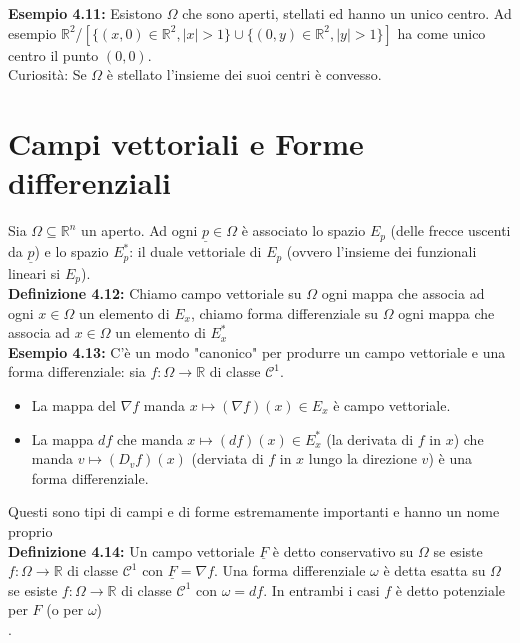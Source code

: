 \documentclass[a4paper,11pt,titlepage]{book}
\begin{document}
\textbf{Esempio 4.11: }Esistono $\Omega$ che sono aperti, stellati ed hanno un unico centro. Ad esempio $\mathbb{R}^2$/$\left[\{(x,0)\in\mathbb{R}^2, |x|>1\}\cup\{(0,y)\in\mathbb{R}^2, |y|>1\}\right]$ ha come unico centro il punto $(0,0)$.\\

Curiosità: Se $\Omega$ è stellato l'insieme dei suoi centri è convesso.

\section{Campi vettoriali e Forme differenziali}

Sia $\Omega\subseteq\mathbb{R}^n$ un aperto. Ad ogni $\underline{p}\in\Omega$ è associato lo spazio $E_p$ (delle frecce uscenti da $\underline p$) e lo spazio $E_p^*$: il duale vettoriale di $E_p$ (ovvero l'insieme dei funzionali lineari si $E_p$).\\

\textbf{Definizione 4.12:} Chiamo campo vettoriale su $\Omega$ ogni mappa che associa ad ogni $x\in\Omega$ un elemento di $E_x$, chiamo forma differenziale su $\Omega$ ogni mappa che associa ad $x\in\Omega$ un elemento di $E_x^*$\\

\textbf{Esempio 4.13:} C'è un modo "canonico" per produrre un campo vettoriale e una forma differenziale: sia $f:\Omega\to\mathbb{R}$ di classe $\mathcal{C}^1$.\begin{itemize}
\item La mappa del $\nabla f$ manda $x\mapsto (\nabla f)(x)\in E_x$ è campo vettoriale.
\item La mappa $df$ che manda $x\mapsto (df)(x)\in E_x^*$ (la derivata di $f$ in $x$) che manda $v\mapsto(D_vf)(x)$ (derviata di $f$ in $x$ lungo la direzione $v$) è una forma differenziale.
\end{itemize}
Questi sono tipi di campi e di forme estremamente importanti e hanno un nome proprio\\

\textbf{Definizione 4.14: }Un campo vettoriale $\underline F$ è detto conservativo su $\Omega$ se esiste $f:\Omega\to\mathbb{R}$ di classe $\mathcal{C}^1$ con $\underline{F}=\nabla f$. Una forma differenziale $\omega$ è detta esatta su $\Omega$ se esiste $f:\Omega\to\mathbb{R}$ di classe $\mathcal{C}^1$ con $\omega=df$. In entrambi i casi $f$ è detto potenziale per $F$ (o per $\omega$)\\.
\end{document}
